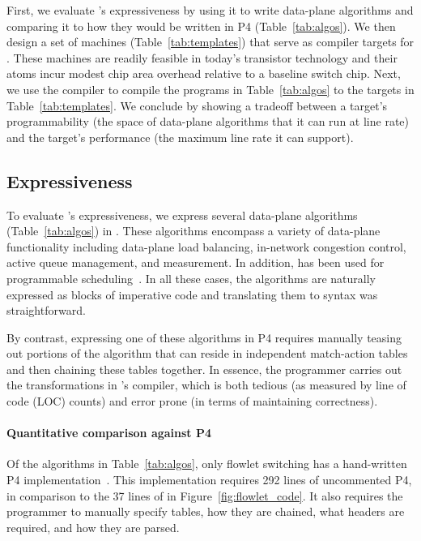 First, we evaluate \pktlanguage's expressiveness by using it to write
data-plane algorithms and comparing it to how they would be written in P4
(Table~\ref{tab:algos}). We then design a set of \absmachine machines
(Table~\ref{tab:templates}) that serve as compiler targets for \pktlanguage.
These machines are readily feasible in today's transistor technology and their
atoms incur modest chip area overhead relative to a baseline switch chip. Next,
we use the \pktlanguage compiler to compile the programs in
Table~\ref{tab:algos} to the targets in Table~\ref{tab:templates}.  We conclude
by showing a tradeoff between a target's programmability (the space of
data-plane algorithms that it can run at line rate) and the target's
performance (the maximum line rate it can support).

\subsection{Expressiveness}
\label{ss:Expressiveness}

To evaluate \pktlanguage's expressiveness, we express several data-plane
algorithms (Table~\ref{tab:algos}) in \pktlanguage. These algorithms encompass
a variety of data-plane functionality including data-plane load balancing,
in-network congestion control, active queue management, and measurement. In
addition, \pktlanguage has been used for programmable
scheduling~\cite{prog_sched_arxiv}.  In all these cases, the algorithms are
naturally expressed as blocks of imperative code and translating them to
\pktlanguage syntax was straightforward.

By contrast, expressing one of these algorithms in P4 requires manually teasing
out portions of the algorithm that can reside in independent match-action
tables and then chaining these tables together. In essence, the programmer
carries out the transformations in \pktlanguage's compiler, which is both
tedious (as measured by line of code (LOC) counts) and error prone (in terms of
maintaining correctness).

\paragraph{Quantitative comparison against P4} Of the algorithms in
Table~\ref{tab:algos}, only flowlet switching has a hand-written P4
implementation~\cite{p4_flowlet}. This implementation requires 292 lines of
uncommented P4, in comparison to the 37 lines of \pktlanguage in
Figure~\ref{fig:flowlet_code}. It also requires the programmer to manually
specify tables, how they are chained, what headers are required, and how they
are parsed.

